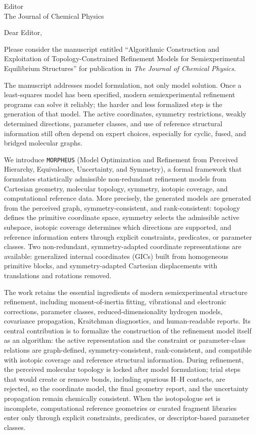 \documentclass[11pt]{letter}
\date{\today}
\begin{document}
\begin{letter}{Editor\\
The Journal of Chemical Physics}

\opening{Dear Editor,}

Please consider the manuscript entitled
``Algorithmic Construction and Exploitation of Topology-Constrained Refinement Models for
Semiexperimental Equilibrium Structures'' for publication in \emph{The Journal
of Chemical Physics}.

The manuscript addresses model formulation, not only model solution. Once a
least-squares model has been specified, modern semiexperimental refinement
programs can solve it reliably; the harder and less formalized step is the
generation of that model. The active coordinates, symmetry restrictions,
weakly determined directions, parameter classes, and use of reference
structural information still often depend on expert choices, especially for
cyclic, fused, and bridged molecular graphs.

We introduce \texttt{MORPHEUS} (Model Optimization and Refinement from
Perceived Hierarchy, Equivalence, Uncertainty, and Symmetry), a formal
framework that formulates statistically admissible non-redundant refinement
models from Cartesian geometry, molecular topology, symmetry, isotopic
coverage, and computational reference data. More precisely, the generated
models are generated from the perceived graph, symmetry-consistent, and
rank-consistent: topology defines the primitive coordinate space, symmetry
selects the admissible active
subspace, isotopic coverage determines which directions are supported, and
reference information enters through explicit constraints, predicates, or
parameter classes. Two non-redundant, symmetry-adapted coordinate
representations are available: generalized internal coordinates (GICs) built
from homogeneous primitive blocks, and symmetry-adapted Cartesian displacements
with translations and rotations removed.

The work retains the essential ingredients of modern semiexperimental
structure refinement, including moment-of-inertia fitting, vibrational and
electronic corrections, parameter classes, reduced-dimensionality hydrogen
models, covariance propagation, Kraitchman diagnostics, and human-readable
reports. Its central contribution is to formalize the construction of the
refinement model itself as an algorithm: the active representation and the
constraint or parameter-class relations are graph-defined,
symmetry-consistent, rank-consistent, and compatible with isotopic coverage and
reference structural information.
During refinement, the perceived molecular topology is locked after model
formulation; trial steps that would create or remove bonds, including
spurious H--H contacts, are rejected, so the coordinate model, the final
geometry report, and the uncertainty propagation remain chemically consistent.
When the isotopologue set is incomplete, computational reference geometries or
curated fragment libraries enter only through explicit
constraints, predicates, or descriptor-based parameter classes.


\end{letter}
\end{document}
